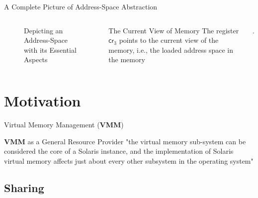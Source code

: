\documentclass[aspectratio=169,xcolor=dvipsnames]{beamer}
\begin{document}
\begin{frame}{A Complete Picture of Address-Space Abstraction}
\begin{columns}[c]
\begin{figure}
\begin{tikzpicture}[x=0.75pt,y=0.75pt,yscale=-0.7,xscale=0.7]
\end{tikzpicture}
    \caption{Depicting an Address-Space with its Essential Aspects}
    \label{fig:enter-label}
\end{figure}
  \begin{block}{The Current View of Memory}
    The register $\mathsf{cr}_3$ points to the current view of the memory, i.e., the loaded address space in the memory \end{block}.
\end{columns}

\end{frame}

\section{Motivation}
\begin{frame}{Virtual Memory Management (\textbf{VMM})}
    \begin{block}{\textbf{VMM} as a General Resource Provider}
    "the virtual memory sub-system can be considered the core of a Solaris instance, and the implementation of Solaris virtual memory affects just about every other subsystem in the operating system" \cite{mcdougall2006solaris}
    \end{block}
\end{frame}

\subsection{Sharing}

\end{document}

